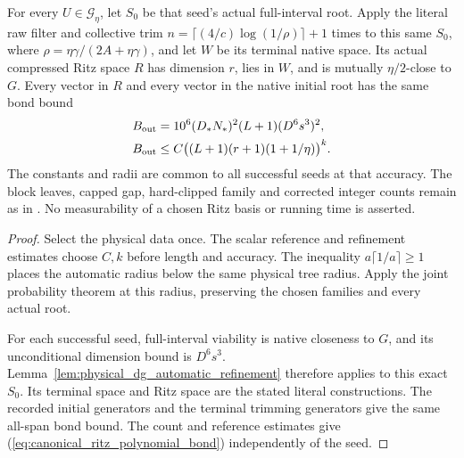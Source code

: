 \begin{theorem}
    For every $U\in\mathcal G_\eta$, let $S_0$ be that seed's actual
    full-interval root. Apply the literal raw filter and collective trim
    $n=\lceil(4/c)\log(1/\rho)\rceil+1$ times to this same $S_0$,
    where $\rho=\eta\gamma/(2A+\eta\gamma)$, and let $W$ be its
    terminal native space. Its actual compressed Ritz space $R$ has
    dimension $r$, lies in $W$, and is mutually $\eta/2$-close to $G$.
    Every vector in $R$ and every vector in the native initial root has
    the same bond bound
    \begin{align}
        B_{\rm out}
         & =10^6(D_*N_*)^2(L+1)(D^6s^3)^2,\notag    \\
        B_{\rm out}
         & \le C\bigl((L+1)(r+1)(1+1/\eta)\bigr)^k.
        \label{eq:canonical_ritz_polynomial_bond}
    \end{align}
    The constants and radii are common to all successful seeds at that
    accuracy. The block leaves, capped gap, hard-clipped family and
    corrected integer counts remain as in
    \cite{gap:alvv16_approximation_parameters,gap:alvv16_final_filter_gain}.
    No measurability of a chosen Ritz basis or running time is asserted.
\end{theorem}
\begin{proof}\leanok
    Select the physical data once. The scalar reference and refinement
    estimates choose $C,k$ before length and accuracy. The inequality
    $a\lceil1/a\rceil\ge1$ places the automatic radius below the same
    physical tree radius. Apply the joint probability theorem at this
    radius, preserving the chosen families and every actual root.

    For each successful seed, full-interval viability is native closeness
    to $G$, and its unconditional dimension bound is $D^6s^3$.
    Lemma~\ref{lem:physical_dg_automatic_refinement} therefore applies to
    this exact $S_0$. Its terminal space and Ritz space are the stated
    literal constructions. The recorded initial generators and the
    terminal trimming generators give the same all-span bond bound.
    The count and reference estimates give
    (\ref{eq:canonical_ritz_polynomial_bond}) independently of the seed.
\end{proof}



